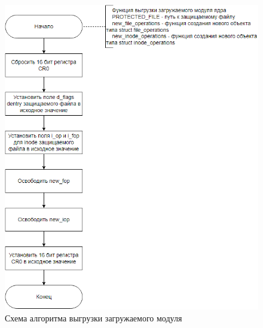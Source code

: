 \begin{figure}[h]
	\centering
	\captionsetup{justification=centering}
	\includegraphics[width=170mm]{img/module_exit.png}
	\caption{Схема алгоритма выгрузки загружаемого модуля}
	\label{fig:module-exit}
\end{figure}


%


